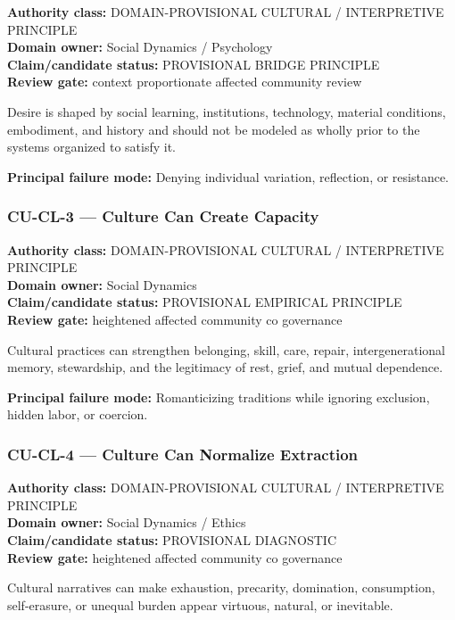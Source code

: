 \documentclass[
  11pt,
]{article}
\begin{document}
\textbf{Authority class:} DOMAIN-PROVISIONAL CULTURAL / INTERPRETIVE
PRINCIPLE\\
\textbf{Domain owner:} Social Dynamics / Psychology\\
\textbf{Claim/candidate status:} PROVISIONAL BRIDGE PRINCIPLE\\
\textbf{Review gate:} context proportionate affected community review

Desire is shaped by social learning, institutions, technology, material
conditions, embodiment, and history and should not be modeled as wholly
prior to the systems organized to satisfy it.

\textbf{Principal failure mode:} Denying individual variation,
reflection, or resistance.

\subsubsection{CU-CL-3 --- Culture Can Create
Capacity}\label{cu-cl-3-culture-can-create-capacity}

\textbf{Authority class:} DOMAIN-PROVISIONAL CULTURAL / INTERPRETIVE
PRINCIPLE\\
\textbf{Domain owner:} Social Dynamics\\
\textbf{Claim/candidate status:} PROVISIONAL EMPIRICAL PRINCIPLE\\
\textbf{Review gate:} heightened affected community co governance

Cultural practices can strengthen belonging, skill, care, repair,
intergenerational memory, stewardship, and the legitimacy of rest,
grief, and mutual dependence.

\textbf{Principal failure mode:} Romanticizing traditions while ignoring
exclusion, hidden labor, or coercion.

\subsubsection{CU-CL-4 --- Culture Can Normalize
Extraction}\label{cu-cl-4-culture-can-normalize-extraction}

\textbf{Authority class:} DOMAIN-PROVISIONAL CULTURAL / INTERPRETIVE
PRINCIPLE\\
\textbf{Domain owner:} Social Dynamics / Ethics\\
\textbf{Claim/candidate status:} PROVISIONAL DIAGNOSTIC\\
\textbf{Review gate:} heightened affected community co governance

Cultural narratives can make exhaustion, precarity, domination,
consumption, self-erasure, or unequal burden appear virtuous, natural,
or inevitable.
\end{document}
